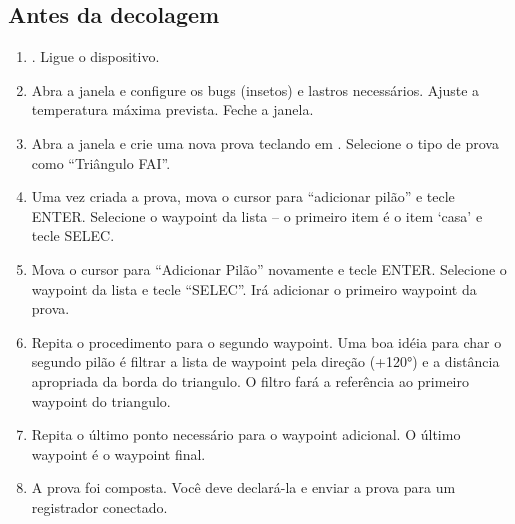 \subsection*{Antes da decolagem}
\begin{enumerate}
\item  .  Ligue o dispositivo.
\item  Abra a janela  e configure os bugs (insetos) e lastros necessários.  Ajuste a temperatura máxima prevista.  Feche a janela.
\item  Abra a janela  e crie uma nova prova teclando em 
. Selecione o tipo de prova como “Triângulo FAI”.
\item  Uma vez criada a prova, mova o cursor para “adicionar pilão” e tecle ENTER.  Selecione o waypoint da lista – o primeiro item é o item ‘casa’ e tecle SELEC.  
\item  Mova o cursor para “Adicionar Pilão” novamente e tecle ENTER.  Selecione o waypoint da lista e tecle “SELEC”.  Irá adicionar o primeiro waypoint da prova.
\item  Repita o procedimento para o segundo waypoint.  Uma boa idéia para char o segundo pilão é filtrar a lista de waypoint pela direção (+120°) e a distância apropriada da borda do triangulo.  O filtro fará a referência ao primeiro waypoint do triangulo.
\item  Repita o último ponto necessário para o waypoint adicional.  O último waypoint é o waypoint final.
\item  A prova foi composta. Você deve declará-la e enviar a prova para um registrador conectado.  
\end{enumerate}

